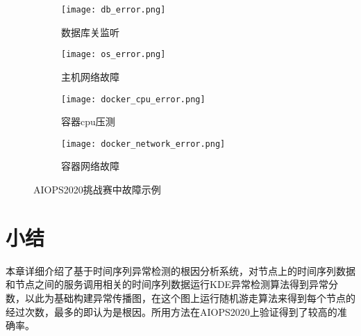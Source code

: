 \begin{figure}[htbp]
  \centering
  \begin{subfigure}[b]{\textwidth}
    \begin{minipage}[t]{0.5\linewidth}
      \centering
      \texttt{[image: db\_error.png]}
      \caption{数据库关监听}
      \label{fig:error:db}
    \end{minipage}
    \begin{minipage}[t]{0.5\linewidth}
      \centering
      \texttt{[image: os\_error.png]}
      \caption{主机网络故障}
      \label{fig:error:os}
    \end{minipage}
  \end{subfigure}

  \begin{subfigure}[b]{\textwidth}
    \begin{minipage}[t]{0.5\linewidth}
      \centering
      \texttt{[image: docker\_cpu\_error.png]}
      \caption{容器cpu压测}
      \label{fig:error:docker}
    \end{minipage}
    \begin{minipage}[t]{0.5\linewidth}
      \centering
      \texttt{[image: docker\_network\_error.png]}
      \caption{容器网络故障}
      \label{fig:error:docker:network}
    \end{minipage}
  \end{subfigure}
  \caption{AIOPS2020挑战赛中故障示例}
  \label{fig:error:example}
\end{figure}

\section{小结}
本章详细介绍了基于时间序列异常检测的根因分析系统，对节点上的时间序列数据和节点之间的服务调用相关的时间序列数据运行KDE异常检测算法得到异常分数，以此为基础构建异常传播图，在这个图上运行随机游走算法来得到每个节点的经过次数，最多的即认为是根因。所用方法在AIOPS2020上验证得到了较高的准确率。